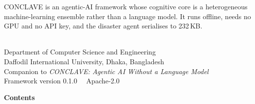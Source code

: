 \documentclass[11pt,a4paper]{article}
\begin{document}
\begin{titlepage}
\vspace{8mm}
\noindent\begin{tcolorbox}[enhanced, colback=conclavebg, colframe=conclavesky,
  boxrule=0pt, leftrule=3pt, arc=1pt, left=10pt, right=10pt, top=8pt, bottom=8pt]
{\sffamily\small\color{conclavegrey}
CONCLAVE is an agentic-AI framework whose cognitive core is a heterogeneous
machine-learning ensemble rather than a language model. It runs offline, needs
no GPU and no API key, and the disaster agent serialises to 232\,KB.}

\vspace{4mm}
\hspace*{0pt}\hfill
{}\hfill
{}\hfill
{}\hspace*{0pt}
\end{tcolorbox}

\vfill
\noindent{}

\vspace{3mm}
\\[1mm]
{\sffamily\footnotesize\color{conclavegrey}
Department of Computer Science and Engineering\\
Daffodil International University, Dhaka, Bangladesh\\[2mm]
Companion to \emph{CONCLAVE: Agentic AI Without a Language Model}\\
Framework version 0.1.0 \, \textbullet \, Apache-2.0}
\end{titlepage}

\newpage
{\color{conclaveblue}\sffamily\LARGE\bfseries Contents}
\vspace{-4mm}
\renewcommand{\contentsname}{}
\tableofcontents
\newpage








\end{document}
